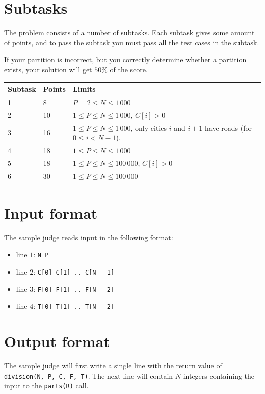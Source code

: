 \section*{Subtasks}
The problem consists of a number of subtasks. Each subtask gives some amount of points, and to pass
the subtask you must pass all the test cases in the subtask.

If your partition is incorrect, but you correctly determine whether a partition exists, your solution
will get $50\%$ of the score. 

\begin{tabular}{|l|l|l|}
  \hline
  \textbf{Subtask} & \textbf{Points} & \textbf{Limits} \\ \hline
  1 & 8 & $P = 2 \le N \le 1\,000$ \\ \hline
  2 & 10 & $1 \le P \le N \le 1\,000$, $C[i] > 0$ \\ \hline
  3 & 16 & $1 \le P \le N \le 1\,000$, only cities $i$ and $i + 1$ have roads (for $0 \le i < N - 1$). \\ \hline
  4 & 18 & $1 \le P \le N \le 1\,000$ \\ \hline
  5 & 18 & $1 \le P \le N \le 100\,000$, $C[i] > 0$ \\ \hline
  6 & 30 & $1 \le P \le N \le 100\,000$ \\ \hline
\end{tabular}

\section*{Input format}
The sample judge reads input in the following format:

\begin{itemize}
  \item line $1$: \texttt{N P}
  \item line $2$: \texttt{C[0] C[1] .. C[N - 1]}
  \item line $3$: \texttt{F[0] F[1] .. F[N - 2]}
  \item line $4$: \texttt{T[0] T[1] .. T[N - 2]}
\end{itemize}

\section*{Output format}
The sample judge will first write a single line with the return value of \texttt{division(N, P, C, F, T)}. The next line will contain $N$ integers containing the input to the \texttt{parts(R)} call.
